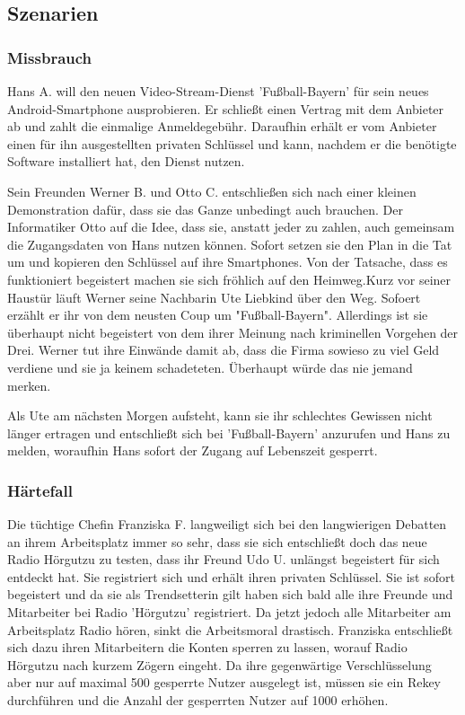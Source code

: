 \documentclass[a4paper,10pt]{scrartcl}
\begin{document}
\subsection{Szenarien}
\subsubsection{Missbrauch}
Hans A. will den neuen Video-Stream-Dienst 'Fußball-Bayern' für sein neues Android-Smartphone ausprobieren. Er schließt einen Vertrag mit dem Anbieter ab und zahlt die einmalige Anmeldegebühr. Daraufhin erhält er vom Anbieter einen für ihn ausgestellten privaten Schlüssel und kann, nachdem er die benötigte Software installiert hat, den Dienst nutzen.

Sein Freunden Werner B. und Otto C. entschließen sich nach einer kleinen Demonstration dafür, dass sie das Ganze unbedingt auch brauchen. Der Informatiker Otto auf die Idee, dass sie, anstatt jeder zu zahlen, auch gemeinsam die Zugangsdaten von Hans nutzen können. Sofort setzen sie den Plan in die Tat um und kopieren den Schlüssel auf ihre Smartphones. Von der Tatsache, dass es funktioniert begeistert machen sie sich fröhlich auf den Heimweg.Kurz vor seiner Haustür läuft Werner seine Nachbarin Ute Liebkind über den Weg. Sofoert erzählt er ihr von dem neusten Coup um "Fußball-Bayern". Allerdings ist sie überhaupt nicht begeistert von dem ihrer Meinung nach kriminellen Vorgehen der Drei. Werner tut ihre Einwände damit ab, dass die Firma sowieso zu viel Geld verdiene und sie ja keinem schadeteten. Überhaupt würde das nie jemand merken. 

Als Ute am nächsten Morgen aufsteht, kann sie ihr schlechtes Gewissen nicht länger ertragen und entschließt sich bei 'Fußball-Bayern' anzurufen und Hans zu melden, woraufhin Hans sofort der Zugang auf Lebenszeit gesperrt.

\subsubsection{Härtefall}
Die tüchtige Chefin Franziska F. langweiligt sich bei den langwierigen
Debatten an ihrem Arbeitsplatz immer so sehr, dass sie sich entschließt doch
das neue Radio Hörgutzu zu testen, dass ihr Freund Udo U. unlängst
begeistert für sich entdeckt hat. Sie registriert sich und erhält ihren privaten Schlüssel.
Sie ist sofort begeistert und da sie als Trendsetterin gilt haben sich bald alle ihre Freunde
und Mitarbeiter bei Radio 'Hörgutzu' registriert. Da jetzt jedoch alle Mitarbeiter am Arbeitsplatz
Radio hören, sinkt die Arbeitsmoral drastisch. Franziska entschließt sich dazu ihren Mitarbeitern
die Konten sperren zu lassen, worauf Radio Hörgutzu nach kurzem Zögern eingeht. Da ihre
gegenwärtige Verschlüsselung aber nur auf maximal 500 gesperrte
Nutzer ausgelegt ist, müssen sie ein Rekey durchführen und die Anzahl der gesperrten Nutzer
auf 1000 erhöhen.
\end{document}
